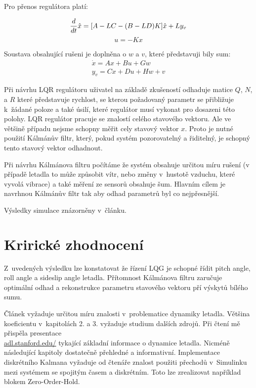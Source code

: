 Pro přenos regulátora platí:

\begin{equation}
    \frac{d}{dt}\hat{x} = [A - LC - (B - LD)K]\hat{x} + Ly_v \\
\end{equation}
\begin{equation}
    u = - Kx
\end{equation}


Soustava obsahující rušeni je doplněna o $w$ a $v$, které představuji bily sum:
\begin{align}
    \dot{x} = Ax + Bu + Gw \\
    y_v = Cx + Du + Hw + v
\end{align}


Při návrhu LQR regulátoru uživatel na základě zkušeností odhaduje matice $Q$,
$N$, a $R$ které představuje rychlost, se kterou požadovaný parametr se přibližuje
k žádané poloze a také úsilí, které regulátor musí vykonat pro dosazeni této
polohy. LQR regulátor pracuje se znalostí celého stavového vektoru. Ale ve
většině případu nejsme schopny měřit cely stavový vektor $x$. Proto je nutné
použití Kálmánův filtr, který, pokud systém pozorovatelný a řiditelný, je
schopný tento stavový vektor odhadnout.


Při návrhu Kálmánova filtru počítáme že systém obsahuje určitou míru rušení (v
případě letadla to může způsobit vítr, nebo změny v hustotě vzduchu, které
vyvolá vibrace) a také měření ze sensorů obsahuje šum. Hlavním cílem je navrhnou
Kálmánův filtr tak aby odhad parametrů byl co nejpřesnější.


Výsledky simulace znázorněny v článku.

\section{Krirické zhodnocení}

Z uvedených výsledku lze konstatovat že řízení LQG je schopné řídit pitch angle,
roll angle a sideslip angle letadla. Přítomnost Kálmánova filtru zaručuje
optimální odhad a rekonstrukce parametru stavového vektoru pří výskytů bílého
sumu.

Článek vyžaduje určitou míru znalosti v problematice dynamiky letadla. Většina
koeficientu v kapitolách 2. a 3. vyžaduje studium dalších zdrojů. Při čtení mě
přispěla presentace \\
\href{http://adl.stanford.edu/sandbox/groups/aa241x/wiki/e054d/attachments/c53d7/Aircraft%20Flight%20Dynamics%202015_04_13.pdf?sessionID=62f441d3fcc6b4014c66ce9aa5d732f561008d30}{adl.stanford.edu/}
tykající základní informace o dynamice letadla.
Nicméně následující kapitoly dostatečně přehledné a informativní. Implementace
diskrétního Kalmana vyžaduje od čtenáře znalost použiti přechodů v Simulinku
mezi systémem se spojitým časem a diskrétním. Toto lze zrealizovat například blokem Zero-Order-Hold.
